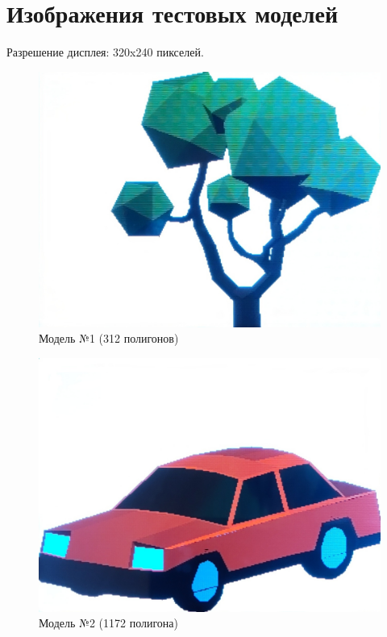 \chapter{Изображения тестовых моделей}
\label{cha:appendix5}
Разрешение дисплея: 320x240 пикселей.

\begin{figure}[h]
	\centering
	\includegraphics[scale=0.2 ]{img/models/tree.jpg}
	\caption{Модель №1 (312 полигонов)}
	\label{fig:tree_img}
\end{figure}

\begin{figure}[h]
	\centering
	\includegraphics[scale=0.2 ]{img/models/car.jpg}
	\caption{Модель №2 (1172 полигона)}
	\label{fig:car_img}
\end{figure}

